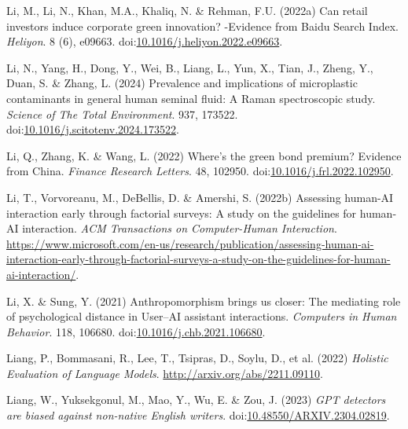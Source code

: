 \documentclass[
  letterpaper,
  DIV=11,
  numbers=noendperiod]{scrartcl}
\newlength{\cslhangindent}
\newenvironment{CSLReferences}[2] %
 {\begin{list}{}{%
  \setlength{\itemindent}{0pt}
  \setlength{\leftmargin}{0pt}
  \setlength{\parsep}{0pt}
  \ifodd #1
   \setlength{\leftmargin}{\cslhangindent}
   \setlength{\itemindent}{-1\cslhangindent}
  \fi
  \setlength{\itemsep}{#2\baselineskip}}}
 {\end{list}}
\begin{document}
\begin{CSLReferences}{0}{1}
Li, M., Li, N., Khan, M.A., Khaliq, N. \& Rehman, F.U. (2022a) Can
retail investors induce corporate green innovation? -{Evidence} from
{Baidu Search Index}. \emph{Heliyon}. 8 (6), e09663.
doi:\href{https://doi.org/10.1016/j.heliyon.2022.e09663}{10.1016/j.heliyon.2022.e09663}.

Li, N., Yang, H., Dong, Y., Wei, B., Liang, L., Yun, X., Tian, J.,
Zheng, Y., Duan, S. \& Zhang, L. (2024) Prevalence and implications of
microplastic contaminants in general human seminal fluid: {A Raman}
spectroscopic study. \emph{Science of The Total Environment}. 937,
173522.
doi:\href{https://doi.org/10.1016/j.scitotenv.2024.173522}{10.1016/j.scitotenv.2024.173522}.

Li, Q., Zhang, K. \& Wang, L. (2022) Where's the green bond premium?
{Evidence} from {China}. \emph{Finance Research Letters}. 48, 102950.
doi:\href{https://doi.org/10.1016/j.frl.2022.102950}{10.1016/j.frl.2022.102950}.

Li, T., Vorvoreanu, M., DeBellis, D. \& Amershi, S. (2022b) Assessing
human-{AI} interaction early through factorial surveys: {A} study on the
guidelines for human-{AI} interaction. \emph{ACM Transactions on
Computer-Human Interaction}.
\url{https://www.microsoft.com/en-us/research/publication/assessing-human-ai-interaction-early-through-factorial-surveys-a-study-on-the-guidelines-for-human-ai-interaction/}.

Li, X. \& Sung, Y. (2021) Anthropomorphism brings us closer: {The}
mediating role of psychological distance in {User}--{AI} assistant
interactions. \emph{Computers in Human Behavior}. 118, 106680.
doi:\href{https://doi.org/10.1016/j.chb.2021.106680}{10.1016/j.chb.2021.106680}.

Liang, P., Bommasani, R., Lee, T., Tsipras, D., Soylu, D., et al. (2022)
\emph{Holistic {Evaluation} of {Language Models}}.
\url{http://arxiv.org/abs/2211.09110}.

Liang, W., Yuksekgonul, M., Mao, Y., Wu, E. \& Zou, J. (2023)
\emph{{GPT} detectors are biased against non-native {English} writers}.
doi:\href{https://doi.org/10.48550/ARXIV.2304.02819}{10.48550/ARXIV.2304.02819}.


\end{CSLReferences}
\end{document}
